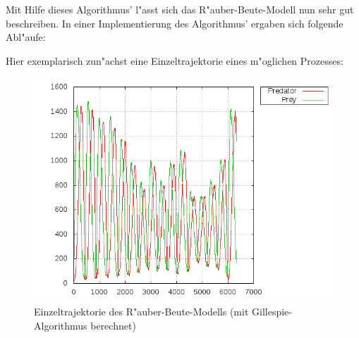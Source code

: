\documentclass[11pt]{article}
\begin{document}
Mit Hilfe dieses Algorithmus' l"asst sich das R"auber-Beute-Modell nun sehr gut beschreiben. In einer Implementierung des Algorithmus' ergaben sich folgende Abl"aufe:

Hier exemplarisch zun"achst eine Einzeltrajektorie eines m"oglichen Prozesses:

\begin{figure}
\caption{Einzeltrajektorie des R"auber-Beute-Modells (mit Gillespie-Algorithmus berechnet)}
\includegraphics[scale=0.7]{Graphiken/ppm1_timepop.png}
\end{figure}
\end{document}
